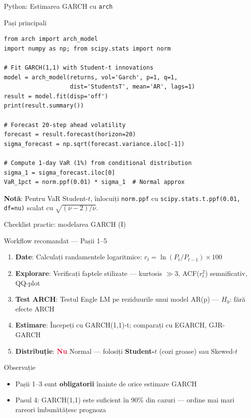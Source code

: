\documentclass[9pt, aspectratio=169, t]{beamer}
\begin{document}
\begin{frame}[fragile]{Python: Estimarea GARCH cu \texttt{arch}}
    \small
        \vspace{-3mm}
        \begin{block}{Pași principali}
    \begin{lstlisting}
from arch import arch_model
import numpy as np; from scipy.stats import norm

# Fit GARCH(1,1) with Student-t innovations
model = arch_model(returns, vol='Garch', p=1, q=1,
                   dist='StudentsT', mean='AR', lags=1)
result = model.fit(disp='off')
print(result.summary())

# Forecast 20-step ahead volatility
forecast = result.forecast(horizon=20)
sigma_forecast = np.sqrt(forecast.variance.iloc[-1])

# Compute 1-day VaR (1%) from conditional distribution
sigma_1 = sigma_forecast.iloc[0]
VaR_1pct = norm.ppf(0.01) * sigma_1  # Normal approx
    \end{lstlisting}
        \end{block}
        \vspace{-3mm}
        \textbf{Notă}: Pentru VaR Student-$t$, înlocuiți \texttt{norm.ppf} cu \texttt{scipy.stats.t.ppf(0.01, df=nu)} scalat cu $\sqrt{(\nu-2)/\nu}$.
\end{frame}

\begin{frame}{Checklist practic: modelarea GARCH (I)}
    \small
        \begin{block}{Workflow recomandat --- Pașii 1--5}
            \begin{enumerate}\setlength{\itemsep}{1pt}
                \item \textbf{Date}: Calculați randamentele logaritmice: $r_t = \ln(P_t / P_{t-1}) \times 100$
                \item \textbf{Explorare}: Verificați faptele stilizate --- kurtosis $\gg 3$, ACF($r_t^2$) semnificativ, QQ-plot
                \item \textbf{Test ARCH}: Testul Engle LM pe reziduurile unui model AR(p) --- $H_0$: fără efecte ARCH
                \item \textbf{Estimare}: Începeți cu GARCH(1,1)-t; comparați cu EGARCH, GJR-GARCH
                \item \textbf{Distribuție}: \textcolor{Crimson}{\textbf{Nu}} Normal --- folosiți \textbf{Student-$t$} (cozi groase) sau Skewed-$t$
            \end{enumerate}
        \end{block}
        \vspace{0.1cm}
        \begin{alertblock}{Observație}
            \begin{itemize}
                \item Pașii 1--3 sunt \textbf{obligatorii} înainte de orice estimare GARCH
                \item Pasul 4: GARCH(1,1) este suficient în 90\% din cazuri --- ordine mai mari rareori îmbunătățesc prognoza
            \end{itemize}
        \end{alertblock}
\end{frame}
\end{document}
